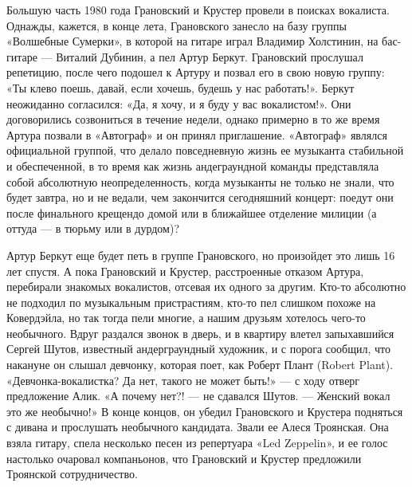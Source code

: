 \documentclass[16pt,a5paper,oneside]{book}
\begin{document}
Большую часть 1980 года Грановский и Крустер провели в поисках вокалиста. Однажды, кажется, в конце лета, Грановского
занесло на базу группы «Волшебные Сумерки», в которой на гитаре играл Владимир Холстинин, на бас-гитаре — Виталий
Дубинин, а пел Артур Беркут. Грановский прослушал репетицию, после чего подошел к Артуру и позвал его в свою новую
группу: «Ты клево поешь, давай, если хочешь, будешь у нас работать!». Беркут неожиданно согласился: «Да, я хочу, и я
буду у вас вокалистом!». Они договорились созвониться в течение недели, однако примерно в то же время Артура позвали в
«Автограф» и он принял приглашение. «Автограф» являлся официальной группой, что делало повседневную жизнь ее музыканта
стабильной и обеспеченной, в то время как жизнь андеграундной команды представляла собой абсолютную неопределенность,
когда музыканты не только не знали, что будет завтра, но и не ведали, чем закончится сегодняшний концерт: поедут они
после финального крещендо домой или в ближайшее отделение милиции (а оттуда — в тюрьму или в дурдом)?

Артур Беркут еще будет петь в группе Грановского, но произойдет это лишь 16 лет спустя. А пока Грановский и Крустер,
расстроенные отказом Артура, перебирали знакомых вокалистов, отсевая их одного за другим. Кто-то абсолютно не подходил
по музыкальным пристрастиям, кто-то пел слишком похоже на Ковердэйла, но так тогда пели многие, а нашим друзьям хотелось
чего-то необычного. Вдруг раздался звонок в дверь, и в квартиру влетел запыхавшийся Сергей Шутов, известный
андерграундный художник, и с порога сообщил, что накануне он слышал девчонку, которая поет, как Роберт Плант (Robert
Plant). «Девчонка-вокалистка? Да нет, такого не может быть!» — с ходу отверг предложение Алик. «А почему нет?! — не
сдавался Шутов. — Женский вокал это же необычно!» В конце концов, он убедил Грановского и Крустера подняться с дивана и
прослушать необычного кандидата. Звали ее Алеся Троянская. Она взяла гитару, спела несколько песен из репертуара «Led
Zeppelin», и ее голос настолько очаровал компаньонов, что Грановский и Крустер предложили Троянской сотрудничество.
\end{document}
